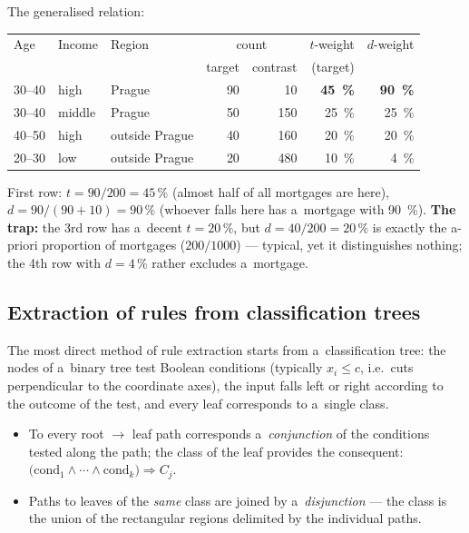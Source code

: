 \documentclass[11pt,a4paper]{article}
\theoremstyle{definition}
\begin{document}
\begin{defbox}
The generalised relation:
\begin{center}
\small
\begin{tabular}{@{}lllrrrr@{}}
\toprule
Age & Income & Region & \multicolumn{2}{c}{count} & $t$-weight & $d$-weight \\
 & & & target & contrast & (target) & \\
\midrule
30--40 & high & Prague & 90 & 10 & \textbf{45~\%} & \textbf{90~\%} \\
30--40 & middle & Prague & 50 & 150 & 25~\% & 25~\% \\
40--50 & high & outside Prague & 40 & 160 & 20~\% & 20~\% \\
20--30 & low & outside Prague & 20 & 480 & 10~\% & 4~\% \\
\bottomrule
\end{tabular}
\end{center}
First row: $t=90/200=45\,\%$ (almost half of all mortgages are here),
$d=90/(90+10)=90\,\%$ (whoever falls here has a~mortgage with 90~\%).
\textbf{The trap:} the 3rd row has a~decent $t=20\,\%$, but $d=40/200=20\,\%$ is exactly
the a-priori proportion of mortgages ($200/1000$) --- typical, yet it distinguishes
nothing; the 4th row with $d=4\,\%$ rather excludes a~mortgage.
\end{defbox}

\subsection{Extraction of rules from classification trees}
\label{ssec:extrakce}

The most direct method of rule extraction starts from a~classification tree: the nodes
of a~binary tree test Boolean conditions (typically $x_i\le c$, i.e.\ cuts perpendicular
to the coordinate axes), the input falls left or right according to the outcome of the
test, and every leaf corresponds to a~single class.

\begin{defbox}
\begin{itemize}
\item To every root $\to$ leaf path corresponds a~\emph{conjunction} of the conditions
      tested along the path; the class of the leaf provides the consequent:
      $\big(\mathrm{cond}_1\wedge\cdots\wedge\mathrm{cond}_k\big)\Rightarrow C_j$.
\item Paths to leaves of the \emph{same} class are joined by a~\emph{disjunction} ---
      the class is the union of the rectangular regions delimited by the individual
      paths.
\end{itemize}
\end{defbox}
\end{document}

